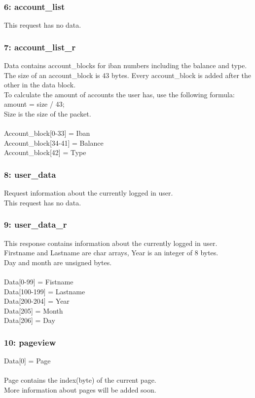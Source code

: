 \documentclass[12pt, a4paper]{article}
\begin{document}
\subsubsection{6: account\_list}
This request has no data.

\subsubsection{7: account\_list\_r}
Data contains account\_blocks for iban numbers including the balance and type.\\
The size of an account\_block is 43 bytes.
Every account\_block is added after the other in the data block.\\

To calculate the amount of accounts the user has, use the following formula:\\
amount = size / 43;\\
Size is the size of the packet.\\
\\
Account\_block[0-33] = Iban\\
Account\_block[34-41] = Balance\\
Account\_block[42] = Type\\

\subsubsection{8: user\_data}
Request information about the currently logged in user.\\
This request has no data.

\subsubsection{9: user\_data\_r}
This response contains information about the currently logged in user.\\
Firstname and Lastname are char arrays, Year is an integer of 8 bytes.\\
Day and month are unsigned bytes.\\
\\
Data[0-99] = Fistname\\
Data[100-199] = Lastname\\
Data[200-204] = Year\\
Data[205] = Month\\
Data[206] = Day\\

\subsubsection{10: pageview}
Data[0] = Page\\
\\
Page contains the index(byte) of the current page.\\
More information about pages will be added soon.
\end{document}
